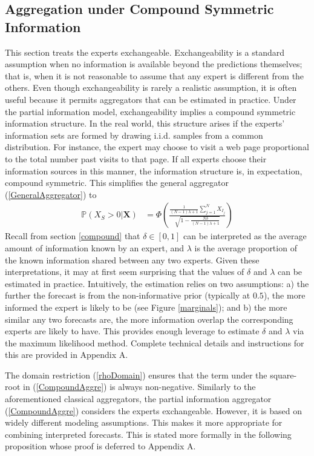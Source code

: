 \documentclass[11pt]{article}
\renewcommand{\P}{\mathbb{P}}
\theoremstyle{definition}
\theoremstyle{definition}
\begin{document}
\subsection{Aggregation under Compound Symmetric Information}
\label{compound2}
This section treats the experts exchangeable. Exchangeability is a standard assumption when no information is available beyond the predictions themselves; that is, when it is not reasonable to assume that any expert is different from the others. Even though exchangeability is rarely a realistic assumption, it is often useful because it permits aggregators that can be estimated in practice. Under the partial information model, exchangeability implies a compound symmetric information structure. In the real world, this structure arises if  the experts' information sets are formed by drawing i.i.d. samples from a common distribution. For instance, the expert may choose to visit a web page proportional to the total number past visits to that page. If all experts choose their information sources in this manner, the information structure is, in expectation, compound symmetric. This simplifies the general  aggregator (\ref{GeneralAggregator})  to
\begin{align}
\P\left(X_S > 0 | \boldsymbol{X}\right) &=\Phi\left(\frac{\frac{1}{(N-1)\lambda +1} \sum_{j=1}^N X_{I_j} }{\sqrt{1- \frac{N\delta}{(N-1)\lambda +1} }}  \right) \label{CompoundAggre}
\end{align}
Recall from section \ref{compound} that $\delta \in [0,1]$ can be interpreted as the average amount of information known by an expert, and $\lambda$ is the average proportion of the known information shared between any two experts. 
Given these interpretations, it may at first seem surprising that the values of $\delta$ and $\lambda$ can be estimated in practice. Intuitively, the estimation relies on two assumptions: a) the further the forecast is from the non-informative prior (typically at $0.5$), the more informed the expert is likely to be (see Figure \ref{marginals}); and b) the more similar any two forecasts are, the more information overlap the corresponding experts are likely to have. This provides enough leverage to estimate $\delta$ and $\lambda$   via the maximum likelihood method. Complete technical details and instructions for this are provided in Appendix A.


The domain restriction (\ref{rhoDomain}) ensures that the term under the square-root in (\ref{CompoundAggre}) is always non-negative. Similarly to the aforementioned classical aggregators,  the partial information aggregator (\ref{CompoundAggre}) considers the experts exchangeable. However, it is based on widely different modeling assumptions. This makes it more appropriate for combining interpreted forecasts. This is stated more formally in the following proposition whose proof is deferred to Appendix A. 
\end{document}
